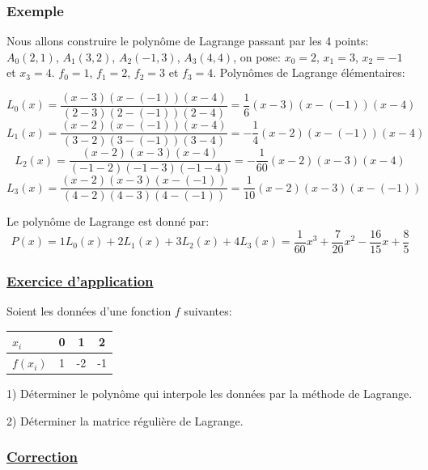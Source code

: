  
 \subsubsection{Exemple}
 
 Nous allons construire le polynôme de Lagrange passant par les 4 points: $A_0(2,1)$, $A_1(3,2)$, $A_2(-1,3)$, $A_3(4,4)$,
 on pose: $x_0 = 2$, $x_1 = 3$, $x_2 = -1$ et $x_3 = 4$. $f_0 = 1$, $f_1 = 2$, $f_2 = 3$ et $f_3 = 4$. Polynômes de Lagrange élémentaires:
 
 \[
 L_0(x) = \frac{(x-3)(x-(-1))(x-4)}{(2-3)(2-(-1))(2-4)} = \frac{1}{6}(x-3)(x-(-1))(x-4)
 \]
 \[
 L_1(x) = \frac{(x-2)(x-(-1))(x-4)}{(3-2)(3-(-1))(3-4)} = -\frac{1}{4}(x-2)(x-(-1))(x-4)
 \]
 \[
 L_2(x) = \frac{(x-2)(x-3)(x-4)}{(-1-2)(-1-3)(-1-4)} = -\frac{1}{60}(x-2)(x-3)(x-4)
 \]
 \[
 L_3(x) = \frac{(x-2)(x-3)(x-(-1))}{(4-2)(4-3)(4-(-1))} = \frac{1}{10}(x-2)(x-3)(x-(-1))
 \]
 
 Le polynôme de Lagrange est donné par:
 \[
 P(x) = 1L_0(x) + 2L_1(x) + 3L_2(x) + 4L_3(x) = \frac{1}{60}x^3 + \frac{7}{20}x^2 - \frac{16}{15}x + \frac{8}{5}
 \]
 
 \subsubsection*{\underline{Exercice d'application}}
 \begin{flushleft}
 	Soient les données d'une fonction $f$ suivantes:
 	\begin{center}
 		\begin{tabular}{|l|c|c|c|}
 			\hline
 			$x_{i}$ & 0 & 1 & 2 \\
 			\hline
 			$f(x_{i})$ & 1 & -2 & -1 \\
 			\hline
 		\end{tabular}
 	\end{center}
 	
 	1) Déterminer le polynôme qui interpole les données par la méthode de Lagrange.
 	
 	2) Déterminer la matrice régulière de Lagrange.
 \end{flushleft}
 
 \subsubsection*{\underline{Correction}}
 
